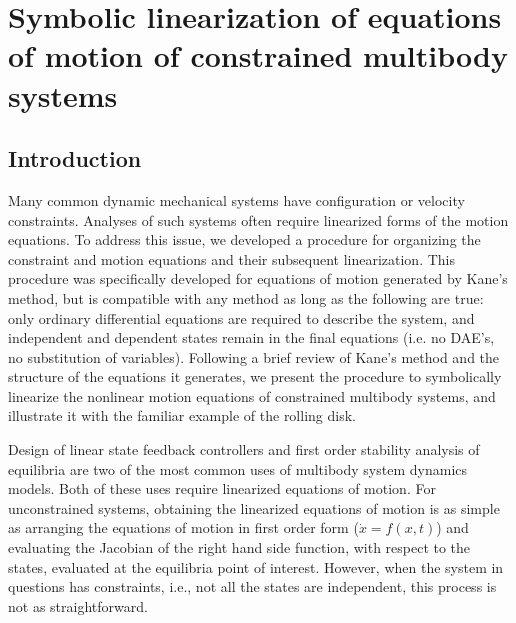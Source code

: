 \chapter{Symbolic linearization of equations of motion of constrained multibody
systems} \label{chapter3}
\section{Introduction}
\label{sec:intro}

Many common dynamic mechanical systems have configuration or velocity constraints.
Analyses of such systems often require linearized forms of the motion
equations.
To address this issue, we developed a procedure for organizing the constraint
and motion equations and their subsequent linearization.  This procedure was
specifically developed for equations of motion generated by Kane's method, but
is compatible with any method as long as the following are true: only ordinary
differential equations are required to describe the system, and independent and
dependent states remain in the final equations (i.e. no DAE's, no substitution
of variables).
Following a brief review of Kane's method and the structure of the equations it
generates, we present the procedure to symbolically linearize the nonlinear
motion equations of constrained multibody systems, and illustrate it with the
familiar example of the rolling disk.

Design of linear state feedback controllers and first order stability analysis
of equilibria are two of the most common uses of multibody system dynamics
models. Both of these uses require linearized equations of motion. For
unconstrained systems, obtaining the linearized equations of motion is as
simple as arranging the equations of motion in first order form ($\dot{x} =
f(x, t)$) and evaluating the Jacobian of the right hand side function, with
respect to the states, evaluated at the equilibria point of interest.  However,
when the system in questions has constraints, i.e., not all the states are
independent, this process is not as straightforward.

